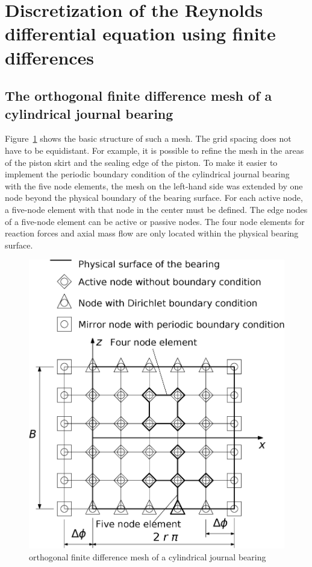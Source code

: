 \section{Discretization of the Reynolds differential equation using finite differences}
\label{sec:h150}
\subsection{The orthogonal finite difference mesh of a cylindrical journal bearing}
Figure~\ref{fig:h150} shows the basic structure of such a mesh. The grid spacing does not have to be equidistant. For example, it is possible to refine the mesh in the areas of the piston skirt and the sealing edge of the piston. To make it easier to implement the periodic boundary condition of the cylindrical journal bearing with the five node elements, the mesh on the left-hand side was extended by one node beyond the physical boundary of the bearing surface. For each active node, a five-node element with that node in the center must be defined. The edge nodes of a five-node element can be active or passive nodes. The four node elements for reaction forces and axial mass flow are only located within the physical bearing surface.

\begin{figure}[htb]
\centering
\includegraphics[width=0.5\linewidth]{fig_h150en}
\caption{orthogonal finite difference mesh of a cylindrical journal bearing}
\label{fig:h150}
\end{figure}

